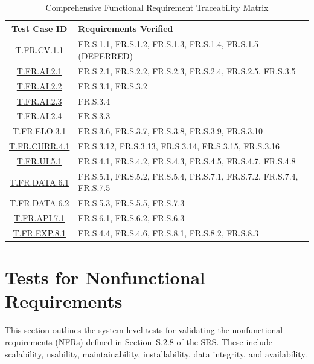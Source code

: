 \documentclass[12pt, titlepage]{article}
\begin{document}
\begin{table}[H]
  \centering
  \caption{Comprehensive Functional Requirement Traceability Matrix}
  \label{tab:traceability}
  \begin{tabularx}{\textwidth}{|c|>{\raggedright\arraybackslash}X|}
    \hline
    \textbf{Test Case ID} & \textbf{Requirements Verified} \\
    \hline
    \hyperlink{T.FR.CV.1.1}{T.FR.CV.1.1} & FR.S.1.1, FR.S.1.2, FR.S.1.3, FR.S.1.4, FR.S.1.5 (DEFERRED) \\
    \hline
    \hyperlink{T.FR.AI.2.1}{T.FR.AI.2.1} & FR.S.2.1, FR.S.2.2, FR.S.2.3, FR.S.2.4, FR.S.2.5, FR.S.3.5 \\
    \hline
    \hyperlink{T.FR.AI.2.2}{T.FR.AI.2.2} & FR.S.3.1, FR.S.3.2 \\
    \hline
    \hyperlink{T.FR.AI.2.3}{T.FR.AI.2.3} & FR.S.3.4 \\
    \hline
    \hyperlink{T.FR.AI.2.4}{T.FR.AI.2.4} & FR.S.3.3 \\
    \hline
    \hyperlink{T.FR.ELO.3.1}{T.FR.ELO.3.1} & FR.S.3.6, FR.S.3.7, FR.S.3.8, FR.S.3.9, FR.S.3.10 \\
    \hline
    \hyperlink{T.FR.CURR.4.1}{T.FR.CURR.4.1} & FR.S.3.12, FR.S.3.13, FR.S.3.14, FR.S.3.15, FR.S.3.16 \\
    \hline
    \hyperlink{T.FR.UI.5.1}{T.FR.UI.5.1} & FR.S.4.1, FR.S.4.2, FR.S.4.3, FR.S.4.5, FR.S.4.7, FR.S.4.8 \\
    \hline
    \hyperlink{T.FR.DATA.6.1}{T.FR.DATA.6.1} & FR.S.5.1, FR.S.5.2, FR.S.5.4, FR.S.7.1, FR.S.7.2, FR.S.7.4, FR.S.7.5 \\
    \hline
    \hyperlink{T.FR.DATA.6.2}{T.FR.DATA.6.2} & FR.S.5.3, FR.S.5.5, FR.S.7.3 \\
    \hline
    \hyperlink{T.FR.API.7.1}{T.FR.API.7.1} & FR.S.6.1, FR.S.6.2, FR.S.6.3 \\
    \hline
    \hyperlink{T.FR.EXP.8.1}{T.FR.EXP.8.1} & FR.S.4.4, FR.S.4.6, FR.S.8.1, FR.S.8.2, FR.S.8.3 \\
    \hline
  \end{tabularx}
\end{table}

\section{Tests for Nonfunctional Requirements}

This section outlines the system-level tests for validating the nonfunctional requirements (NFRs) defined in Section~S.2.8 of the SRS. These include scalability, usability, maintainability, installability, data integrity, and availability. 
\end{document}
